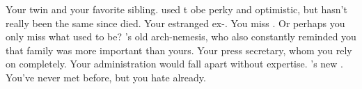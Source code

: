 \documentclass[char]{Katmeers}
\begin{document}
\begin{contacts}
	\contact{\cGinny{}} Your twin \cGinny{\sibling} and your favorite sibling. \cGinny{\They} used t obe perky and optimistic, but hasn't really been the same since \cHarry{} died.
	\contact{\cHermione{}} Your estranged ex-\cHermione{\spouse}. You miss \cHermione{\them}. Or perhaps you only miss what \cHermione{\they} used to be?
	\contact{\cMalfoy{}} \cHarry{}'s old arch-nemesis, who also constantly reminded you that \cMalfoy{\their} family was more important than yours.
	\contact{\cLucius{}} Your press secretary, whom you rely on completely. Your administration would fall apart without \cLucius{\their} expertise.
	\contact{\cHarry{\MYname}} \cHermione{}'s new \cHarry{\spouse}. You've never met \cHarry{\them} before, but you hate \cHarry{\them} already.
\end{contacts}
\end{document}
